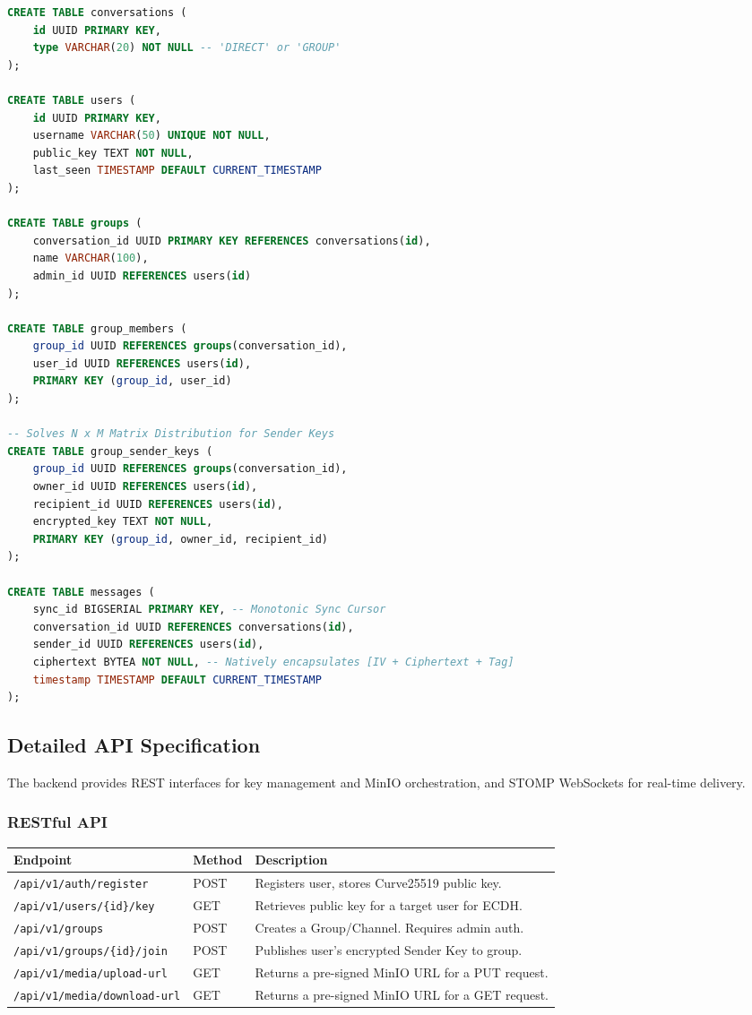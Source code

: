 \documentclass[12pt, a4paper]{article}
\begin{document}
\begin{lstlisting}[language=SQL, title={PostgreSQL Detailed Schema with Referential Integrity}]
CREATE TABLE conversations (
    id UUID PRIMARY KEY,
    type VARCHAR(20) NOT NULL -- 'DIRECT' or 'GROUP'
);

CREATE TABLE users (
    id UUID PRIMARY KEY,
    username VARCHAR(50) UNIQUE NOT NULL,
    public_key TEXT NOT NULL, 
    last_seen TIMESTAMP DEFAULT CURRENT_TIMESTAMP
);

CREATE TABLE groups (
    conversation_id UUID PRIMARY KEY REFERENCES conversations(id),
    name VARCHAR(100),
    admin_id UUID REFERENCES users(id)
);

CREATE TABLE group_members (
    group_id UUID REFERENCES groups(conversation_id),
    user_id UUID REFERENCES users(id),
    PRIMARY KEY (group_id, user_id)
);

-- Solves N x M Matrix Distribution for Sender Keys
CREATE TABLE group_sender_keys (
    group_id UUID REFERENCES groups(conversation_id),
    owner_id UUID REFERENCES users(id),
    recipient_id UUID REFERENCES users(id),
    encrypted_key TEXT NOT NULL,
    PRIMARY KEY (group_id, owner_id, recipient_id)
);

CREATE TABLE messages (
    sync_id BIGSERIAL PRIMARY KEY, -- Monotonic Sync Cursor
    conversation_id UUID REFERENCES conversations(id),
    sender_id UUID REFERENCES users(id),
    ciphertext BYTEA NOT NULL, -- Natively encapsulates [IV + Ciphertext + Tag]
    timestamp TIMESTAMP DEFAULT CURRENT_TIMESTAMP
);
\end{lstlisting}

\subsection{Detailed API Specification}
The backend provides REST interfaces for key management and MinIO orchestration, and STOMP WebSockets for real-time delivery.

\subsubsection{RESTful API}
\begin{longtable}{|p{4.5cm}|p{2cm}|p{8cm}|}
\hline
\textbf{Endpoint} & \textbf{Method} & \textbf{Description} \\ \hline
\endfirsthead
\hline
\texttt{/api/v1/auth/register} & POST & Registers user, stores Curve25519 public key. \\ \hline
\texttt{/api/v1/users/\{id\}/key} & GET & Retrieves public key for a target user for ECDH. \\ \hline
\texttt{/api/v1/groups} & POST & Creates a Group/Channel. Requires admin auth. \\ \hline
\texttt{/api/v1/groups/\{id\}/join} & POST & Publishes user's encrypted Sender Key to group. \\ \hline
\texttt{/api/v1/media/upload-url} & GET & Returns a pre-signed MinIO URL for a PUT request. \\ \hline
\texttt{/api/v1/media/download-url} & GET & Returns a pre-signed MinIO URL for a GET request. \\ \hline
\end{longtable}
\end{document}
